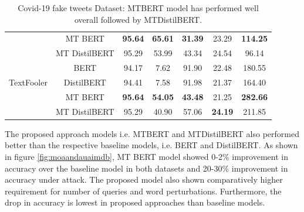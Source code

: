 \documentclass[%
	BCOR=8mm, %
	DIV=12,
	toc=bibliography, %
	toc=listof, %
	oneside, %
	egregdoesnotlikesansseriftitles, %
	]{scrbook}
\begin{document}
\begin{table}[H]
{\begin{tabular}{|c|c|c|c|c|c|c|}
                & MT BERT &               \textbf{ 95.64} &                    \textbf{65.61} &                  \textbf{31.39}&                     23.29 &           \textbf{114.25} \\
                & MT DistilBERT &                95.29 &                    53.99 &                  43.34 &                     24.54 &            96.14 \\
                \midrule
                 & BERT &                94.17 &                     7.62 &                  91.90 &                     22.48 &           180.55 \\
                TextFooler & DistilBERT &                94.41 &                     7.58 &                  91.98 &                     21.37 &           164.40 \\
                & MT BERT &                \textbf{95.64} &                   \textbf{ 54.05} &                  \textbf{43.48} &                     21.25 &           \textbf{282.66} \\
                & MT DistilBERT &                95.29 &                    40.90 &                  57.06 &                    \textbf{ 24.19} &           211.85 \\
            \bottomrule
        \end{tabular}
    }
    \caption[Experiment Result of Covid-19 fake tweets]{Covid-19 fake tweets Dataset: MTBERT model has performed well overall followed by MTDistilBERT.  }
    \label{table:FakeNewsExpRes}
\end{table}
The proposed approach models i.e. MTBERT and MTDistilBERT also performed better than the respective baseline models, i.e. BERT and DistilBERT.  As shown in figure \ref{fig:moaandauaimdb}, MT BERT model showed 0-2\% improvement in accuracy over the baseline model in both datasets and 20-30\% improvement in accuracy under attack. The proposed model also shown comparatively higher requirement for number of queries and word perturbations. Furthermore, the drop in accuracy is lowest in proposed approaches than baseline models.
\end{document}
